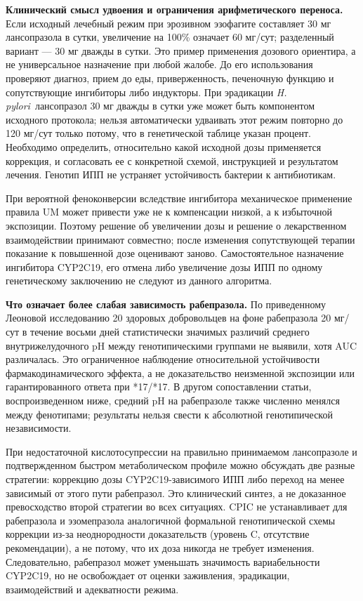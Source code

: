 \documentclass[11pt,a4paper,notitlepage]{report}
\newcommand{\Hp}{\textit{H. pylori}}
\newcommand{\src}[1]{\unskip\space\cite{#1}}
\begin{document}
\textbf{Клинический смысл удвоения и ограничения арифметического переноса.} Если исходный лечебный режим при эрозивном эзофагите составляет 30 мг лансопразола в сутки, увеличение на 100\% означает 60 мг/сут; разделенный вариант --- 30 мг дважды в сутки. Это пример применения дозового ориентира, а не универсальное назначение при любой жалобе. До его использования проверяют диагноз, прием до еды, приверженность, печеночную функцию и сопутствующие ингибиторы либо индукторы. При эрадикации \Hp\ лансопразол 30 мг дважды в сутки уже может быть компонентом исходного протокола; нельзя автоматически удваивать этот режим повторно до 120 мг/сут только потому, что в генетической таблице указан процент. Необходимо определить, относительно какой исходной дозы применяется коррекция, и согласовать ее с конкретной схемой, инструкцией и результатом лечения. Генотип ИПП не устраняет устойчивость бактерии к антибиотикам.\src{cpic,uslabel,acggerd,acghp,maastricht}

При вероятной феноконверсии вследствие ингибитора механическое применение правила UM может привести уже не к компенсации низкой, а к избыточной экспозиции. Поэтому решение об увеличении дозы и решение о лекарственном взаимодействии принимают совместно; после изменения сопутствующей терапии показание к повышенной дозе оценивают заново. Самостоятельное назначение ингибитора CYP2C19, его отмена либо увеличение дозы ИПП по одному генетическому заключению не следуют из данного алгоритма.\src{molfluvox,cpic,uslabel}

\textbf{Что означает более слабая зависимость рабепразола.} По приведенному Леоновой исследованию 20 здоровых добровольцев на фоне рабепразола 20 мг/сут в течение восьми дней статистически значимых различий среднего внутрижелудочного pH между генотипическими группами не выявили, хотя AUC различалась. Это ограниченное наблюдение относительной устойчивости фармакодинамического эффекта, а не доказательство неизменной экспозиции или гарантированного ответа при *17/*17. В другом сопоставлении статьи, воспроизведенном ниже, средний pH на рабепразоле также численно менялся между фенотипами; результаты нельзя свести к абсолютной генотипической независимости.\src{leonova2015,cpic}

При недостаточной кислотосупрессии на правильно принимаемом лансопразоле и подтвержденном быстром метаболическом профиле можно обсуждать две разные стратегии: коррекцию дозы CYP2C19-зависимого ИПП либо переход на менее зависимый от этого пути рабепразол. Это клинический синтез, а не доказанное превосходство второй стратегии во всех ситуациях. CPIC не устанавливает для рабепразола и эзомепразола аналогичной формальной генотипической схемы коррекции из-за неоднородности доказательств (уровень C, отсутствие рекомендации), а не потому, что их доза никогда не требует изменения. Следовательно, рабепразол может уменьшать значимость вариабельности CYP2C19, но не освобождает от оценки заживления, эрадикации, взаимодействий и адекватности режима.\src{leonova2015,cpic,asge2025}
\end{document}
